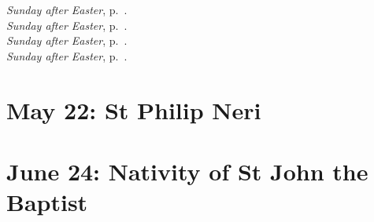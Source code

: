 {{{\begin{multicols}{2}
\noindent\emph{ Sunday after Easter}, p.~\pageref{easter2}.\\
\emph{ Sunday after Easter}, p.~\pageref{easter3}.\\
\emph{ Sunday after Easter}, p.~\pageref{easter4}.\\
\emph{ Sunday after Easter}, p.~\pageref{easter5}.
\end{multicols}
}
}

{
\section{May 22: St Philip Neri}
\subtitle{ Class (proper to the Oratory)}
\subtitle{I \& II Vespers}

\def\definevesperspropers{
}
\def\definevesperspropersalt{
}
\def\vesperspropersnote{At II Vespers:}
\def\vesperspropersaltnote{At I Vespers:}
\def\premagverses{\greseteolcustos{manual}}

\medskip
{}
}

{
\section{June 24: Nativity of St John the Baptist}
\subtitle{ Class}
\subtitle{I \& II Vespers}

\def\definevesperspropers{
  \def\prepsalmfive{\greseteolcustos{manual}}
}
\def\definevesperspropersalt{}
\def\vesperspropersnote{At II Vespers:}
\def\vesperspropersaltnote{At I Vespers:}
\def\prevesperspsalms{\noindent\printnote{Chapter and following, page \pageref{june24-chapter}.\\}}
\def\vesperspsalmslabel{\label{june24-2vespers}}
\def\prevesperspsalmsalt{\noindent\printnote{II Vespers psalms and antiphons, page \pageref{june24-2vespers}.}\medskip}
\def\prechapter{\label{june24-chapter}}
\def\premagverses{\greseteolcustos{manual}}

}}
